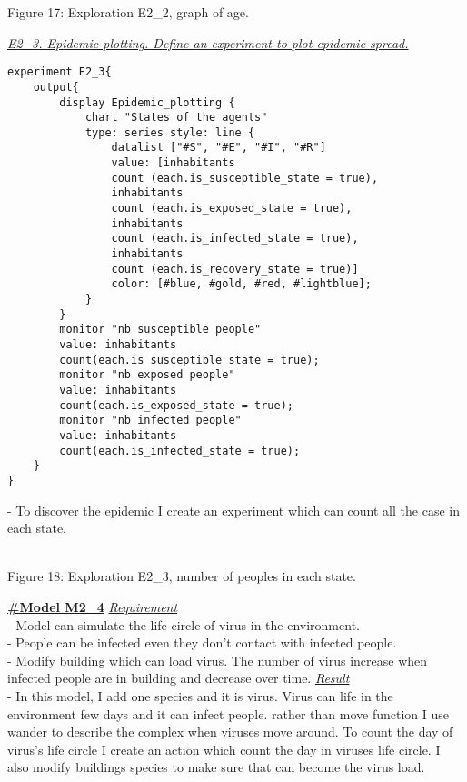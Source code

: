 \documentclass{article}
\begin{document}
\begin{pic15}
\begin{pic15}
\begin{pic17}
\caption{Figure 17: Exploration E2\_2, graph of age.} 
\end{pic17}
\newpage
\underline{\textit{E2\_3. Epidemic plotting. Define an experiment to plot epidemic spread.}}
\begin{tcolorbox}
\begin{lstlisting}
experiment E2_3{
	output{
		display Epidemic_plotting {
			chart "States of the agents" 
			type: series style: line {
				datalist ["#S", "#E", "#I", "#R"] 
				value: [inhabitants 
				count (each.is_susceptible_state = true), 
				inhabitants 
				count (each.is_exposed_state = true), 
				inhabitants 
				count (each.is_infected_state = true), 
				inhabitants 
				count (each.is_recovery_state = true)] 
				color: [#blue, #gold, #red, #lightblue];
			}
		}
		monitor "nb susceptible people" 
		value: inhabitants 
		count(each.is_susceptible_state = true);
		monitor "nb exposed people" 
		value: inhabitants 
		count(each.is_exposed_state = true);
		monitor "nb infected people" 
		value: inhabitants 
		count(each.is_infected_state = true);
	}
}
\end{lstlisting}
\end{tcolorbox}
\newpage
\raggedright- To discover the epidemic I create an experiment which can count all the case in each state.
\begin{pic18}
\\
\caption{Figure 18: Exploration E2\_3, number of peoples in each state.} 
\end{pic18}
\newline\newline
\underline{\textbf{#Model M2\_4}}
\newline\newline
\underline{\emph{Requirement}}
\\- Model can simulate the life circle of virus in the environment.
\\- People can be infected even they don't contact with infected people.
\\- Modify building which can load virus. The number of virus increase when infected people are in building and decrease over time.
\newline\newline
\underline{\emph{Result}}\\
- In this model, I add one species and it is virus. Virus can life in the environment few days and it can infect people. rather than move function I use wander to describe the complex when viruses move around. To count the day of virus's life circle I create an action which count the day in viruses life circle. I also modify buildings species to make sure that can become the virus load.

\end{pic15}
\end{pic15}
\end{document}
